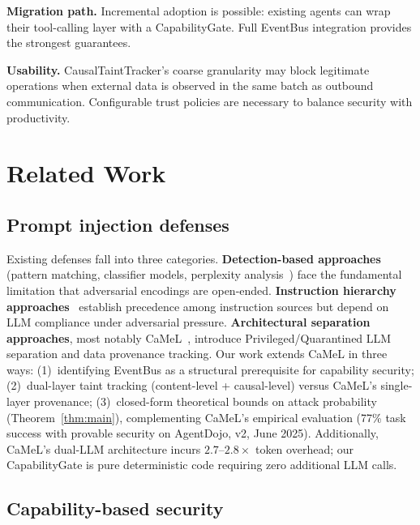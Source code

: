 \documentclass[pdflatex,sn-nature]{sn-jnl}%
\theoremstyle{thmstyleone}%
\theoremstyle{thmstyletwo}%
\theoremstyle{thmstylethree}%
\begin{document}
\textbf{Migration path.} Incremental adoption is possible: existing agents can wrap their tool-calling layer with a CapabilityGate. Full EventBus integration provides the strongest guarantees.

\textbf{Usability.} CausalTaintTracker's coarse granularity may block legitimate operations when external data is observed in the same batch as outbound communication. Configurable trust policies are necessary to balance security with productivity.

\section{Related Work}\label{sec:related}

\subsection{Prompt injection defenses}\label{subsec:pi-defenses}

Existing defenses fall into three categories. \textbf{Detection-based approaches} (pattern matching, classifier models, perplexity analysis~\cite{chhabra2025agentic}) face the fundamental limitation that adversarial encodings are open-ended. \textbf{Instruction hierarchy approaches}~\cite{wallace2024instruction} establish precedence among instruction sources but depend on LLM compliance under adversarial pressure. \textbf{Architectural separation approaches}, most notably CaMeL~\cite{debenedetti2025camel}, introduce Privileged/Quarantined LLM separation and data provenance tracking. Our work extends CaMeL in three ways: (1)~identifying EventBus as a structural prerequisite for capability security; (2)~dual-layer taint tracking (content-level + causal-level) versus CaMeL's single-layer provenance; (3)~closed-form theoretical bounds on attack probability (Theorem~\ref{thm:main}), complementing CaMeL's empirical evaluation (77\% task success with provable security on AgentDojo, v2, June 2025). Additionally, CaMeL's dual-LLM architecture incurs $2.7$--$2.8\times$ token overhead; our CapabilityGate is pure deterministic code requiring zero additional LLM calls.

\subsection{Capability-based security}\label{subsec:caps}
\end{document}
